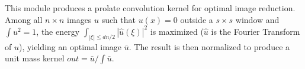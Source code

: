 This module produces a prolate convolution kernel for optimal
image reduction. Among all $n\times n$ images $u$ such that $u(x)=0$ 
outside a $s\times s$ window and $\int u^2=1$, the energy 
$\int_{|\xi|\leq dn/2} |\hat u(\xi)|^2$ is maximized ($\hat u$ is 
the Fourier Transform of $u$), yielding an optimal image $\bar u$.
The result is then normalized to produce a unit mass kernel 
$out= \bar u/\int \bar u$.
